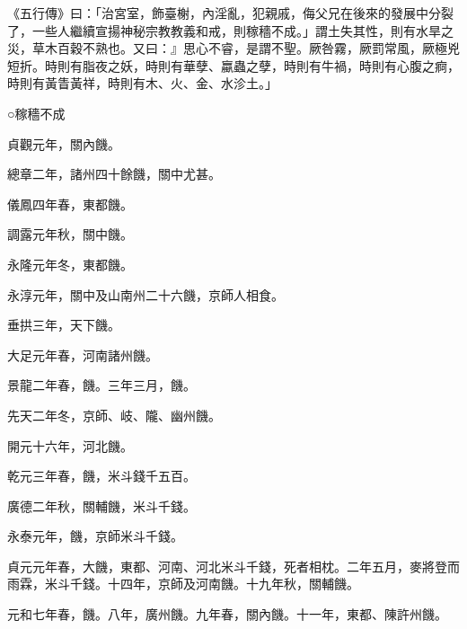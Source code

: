 
\begin{pinyinscope}

 《五行傳》曰：「治宮室，飾臺榭，內淫亂，犯親戚，侮父兄在後來的發展中分裂了，一些人繼續宣揚神秘宗教教義和戒，則稼穡不成。」謂土失其性，則有水旱之災，草木百穀不熟也。又曰：』思心不睿，是謂不聖。厥咎霧，厥罰常風，厥極兇短折。時則有脂夜之妖，時則有華孽、蠃蟲之孽，時則有牛禍，時則有心腹之痾，時則有黃眚黃祥，時則有木、火、金、水沴土。」



 ○稼穡不成



 貞觀元年，關內饑。



 總章二年，諸州四十餘饑，關中尤甚。



 儀鳳四年春，東都饑。



 調露元年秋，關中饑。



 永隆元年冬，東都饑。



 永淳元年，關中及山南州二十六饑，京師人相食。



 垂拱三年，天下饑。



 大足元年春，河南諸州饑。



 景龍二年春，饑。三年三月，饑。



 先天二年冬，京師、岐、隴、幽州饑。



 開元十六年，河北饑。



 乾元三年春，饑，米斗錢千五百。



 廣德二年秋，關輔饑，米斗千錢。



 永泰元年，饑，京師米斗千錢。



 貞元元年春，大饑，東都、河南、河北米斗千錢，死者相枕。二年五月，麥將登而雨霖，米斗千錢。十四年，京師及河南饑。十九年秋，關輔饑。



 元和七年春，饑。八年，廣州饑。九年春，關內饑。十一年，東都、陳許州饑。




\end{pinyinscope}
